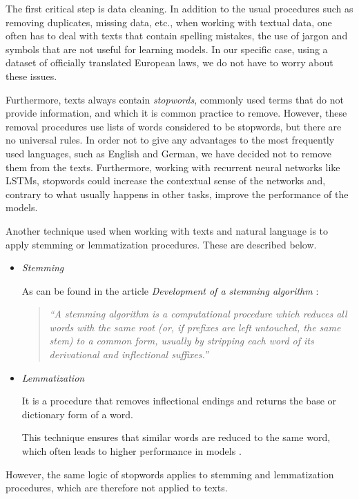 \documentclass[letterpaper,11pt]{article}
\begin{document}
The first critical step is data cleaning. In addition to the usual procedures such as removing duplicates, missing data, etc., when working with textual data, one often has to deal with texts that contain spelling mistakes, the use of jargon and symbols that are not useful for learning models. In our specific case, using a dataset of officially translated European laws, we do not have to worry about these issues. 

Furthermore, texts always contain \textit{stopwords}, commonly used terms that do not provide information, and which it is common practice to remove. However, these removal procedures use lists of words considered to be stopwords, but there are no universal rules. In order not to give any advantages to the most frequently used languages, such as English and German, we have decided not to remove them from the texts. Furthermore, working with recurrent neural networks like LSTMs, stopwords could increase the contextual sense of the networks and, contrary to what usually happens in other tasks, improve the performance of the models.

Another technique used when working with texts and natural language is to apply stemming or lemmatization procedures. These are described below.
\begin{itemize}
  \item \textit{Stemming}
  
  As can be found in the article \textit{Development of a stemming algorithm} \cite{lovins1968development}:
  \begin{quote}
    \textit{``A stemming algorithm is a computational procedure which reduces all words with the same root (or, if prefixes are left untouched, the same stem) to a common form, usually by stripping each word of its derivational and inflectional suffixes.''}
  \end{quote}
  
    \item \textit{Lemmatization}
  
  It is a procedure that removes inflectional endings and returns the base or dictionary form of a word.

  This technique ensures that similar words are reduced to the same word, which often leads to higher performance in models \cite{balakrishnan2014stemming}. 

\end{itemize}

However, the same logic of stopwords applies to {stemming} and {lemmatization} procedures, which are therefore not applied to texts.
\end{document}
